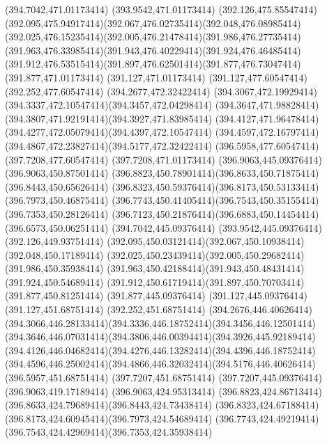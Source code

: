 {{	\lineto(394.7042,471.01173414)
	\lineto(393.9542,471.01173414)
	\lineto(392.126,475.85547414)
	\curveto(392.095,475.94917414)(392.067,476.02735414)(392.048,476.08985414)
	\curveto(392.025,476.15235414)(392.005,476.21478414)(391.986,476.27735414)
	\curveto(391.963,476.33985414)(391.943,476.40229414)(391.924,476.46485414)
	\curveto(391.912,476.53515414)(391.897,476.62501414)(391.877,476.73047414)
	\lineto(391.877,471.01173414)
	\lineto(391.127,471.01173414)
	\lineto(391.127,477.60547414)
	\lineto(392.252,477.60547414)
	\lineto(394.2677,472.32422414)
	\curveto(394.3067,472.19929414)(394.3337,472.10547414)(394.3457,472.04298414)
	\curveto(394.3647,471.98828414)(394.3807,471.92191414)(394.3927,471.83985414)
	\curveto(394.4127,471.96478414)(394.4277,472.05079414)(394.4397,472.10547414)
	\curveto(394.4597,472.16797414)(394.4867,472.23827414)(394.5177,472.32422414)
	\lineto(396.5958,477.60547414)
	\lineto(397.7208,477.60547414)
	\lineto(397.7208,471.01173414)
	\closepath
	\moveto(396.9063,445.09376414)
	\lineto(396.9063,450.87501414)
	\curveto(396.8823,450.78901414)(396.8633,450.71875414)(396.8443,450.65626414)
	\curveto(396.8323,450.59376414)(396.8173,450.53133414)(396.7973,450.46875414)
	\curveto(396.7743,450.41405414)(396.7543,450.35155414)(396.7353,450.28126414)
	\curveto(396.7123,450.21876414)(396.6883,450.14454414)(396.6573,450.06251414)
	\lineto(394.7042,445.09376414)
	\lineto(393.9542,445.09376414)
	\lineto(392.126,449.93751414)
	\curveto(392.095,450.03121414)(392.067,450.10938414)(392.048,450.17189414)
	\curveto(392.025,450.23439414)(392.005,450.29682414)(391.986,450.35938414)
	\curveto(391.963,450.42188414)(391.943,450.48431414)(391.924,450.54689414)
	\curveto(391.912,450.61719414)(391.897,450.70703414)(391.877,450.81251414)
	\lineto(391.877,445.09376414)
	\lineto(391.127,445.09376414)
	\lineto(391.127,451.68751414)
	\lineto(392.252,451.68751414)
	\lineto(394.2676,446.40626414)
	\curveto(394.3066,446.28133414)(394.3336,446.18752414)(394.3456,446.12501414)
	\curveto(394.3646,446.07031414)(394.3806,446.00394414)(394.3926,445.92189414)
	\curveto(394.4126,446.04682414)(394.4276,446.13282414)(394.4396,446.18752414)
	\curveto(394.4596,446.25002414)(394.4866,446.32032414)(394.5176,446.40626414)
	\lineto(396.5957,451.68751414)
	\lineto(397.7207,451.68751414)
	\lineto(397.7207,445.09376414)
	\closepath
	\moveto(396.9063,419.17189414)
	\lineto(396.9063,424.95313414)
	\curveto(396.8823,424.86713414)(396.8633,424.79689414)(396.8443,424.73438414)
	\curveto(396.8323,424.67188414)(396.8173,424.60945414)(396.7973,424.54689414)
	\curveto(396.7743,424.49219414)(396.7543,424.42969414)(396.7353,424.35938414)
}}

